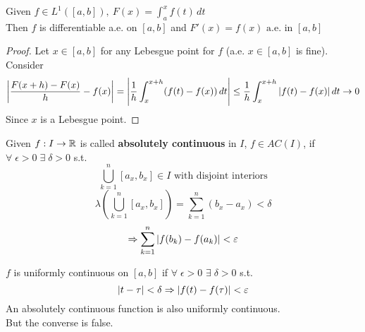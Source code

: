 \begin{theorem}
Given \(f \in L^1([a,b]),\ F(x) = \int_a^xf(t) \, dt\) \\
Then \(f\) is differentiable a.e. on \([a,b]\) and \(F'(x) = f(x) \text{ a.e. in } [a,b]\)    
\end{theorem}
\begin{proof}
    Let \(x \in [a,b]\) for any Lebesgue point for \(f\) (a.e. \(x \in [a,b]\) is fine). Consider
    \[
        \left|{\frac{F(x+h)-F(x)}{h} - f(x)}\right| = \abs{\frac{1}{h} \int_x^{x+h} (f(t) - f(x)) \,dt } \leq \frac{1}{h} \int_x^{x+h} |f(t) - f(x)| \,dt \to 0 
    \]
    Since \(x\) is a Lebesgue point.
\end{proof}
\begin{definition}
    Given \(f : I \to \mathbb{R}\) is called \textbf{absolutely continuous} in \(I\), \(f \in AC(I)\), if \(\forall \; \epsilon >0 \; \exists \; \delta >0\)  
    s.t. 
    \[
        \bigcup_{k=1}^n [a_x, b_x] \in I \text{ with disjoint interiors}
    \] 
    \[
        \lambda(\bigcup_{k=1}^n [a_x, b_x]) = \sum_{k=1}^n (b_x -a_x) < \delta
    \]
    \[
        \Rightarrow \sum_{k=1}^n \abs{f(b_k)-f(a_k)} < \varepsilon
    \]
\end{definition}
\begin{remark}
    \(f\) is uniformly continuous on \([a,b]\) if \(\forall \; \epsilon > 0\) \(\exists \; \delta > 0\) s.t. 
    \[
        \abs{t - \tau} < \delta \Rightarrow \abs{f(t)-f(\tau)} < \varepsilon
    \]
    An absolutely continuous function is also uniformly continuous. \\
    But the converse is false.
\end{remark}

